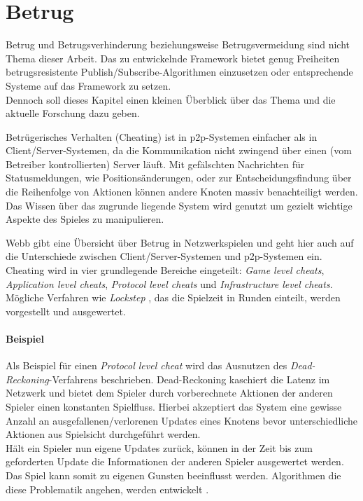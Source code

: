 \section{Betrug}
\label{chap:grundlagen:cheating}
Betrug und Betrugsverhinderung beziehungsweise Betrugsvermeidung sind nicht Thema dieser Arbeit. Das zu entwickelnde Framework bietet genug Freiheiten betrugsresistente Publish/Subscribe-Algorithmen einzusetzen oder entsprechende Systeme auf das Framework zu setzen.\\
Dennoch soll dieses Kapitel einen kleinen Überblick über das Thema und die aktuelle Forschung dazu geben.

Betrügerisches Verhalten (Cheating) ist in p2p-Systemen einfacher als in Client/Server-Systemen, da die Kommunikation nicht zwingend über einen (vom Betreiber kontrollierten) Server läuft. Mit gefälschten Nachrichten für Statusmeldungen, wie Positionsänderungen, oder zur Entscheidungsfindung über die Reihenfolge von Aktionen können andere Knoten massiv benachteiligt werden. Das Wissen über das zugrunde liegende System wird genutzt um gezielt wichtige Aspekte des Spieles zu manipulieren.

Webb \cite{Webb2007Cheating} gibt eine Übersicht über Betrug in Netzwerkspielen und geht hier auch auf die Unterschiede zwischen Client/Server-Systemen und p2p-Systemen ein. Cheating wird in vier grundlegende Bereiche eingeteilt: \emph{Game level cheats}, \emph{Application level cheats}, \emph{Protocol level cheats} und \emph{Infrastructure level cheats}. Mögliche Verfahren wie \emph{Lockstep} \cite{Baughman2007}, das die Spielzeit in Runden einteilt, werden vorgestellt und ausgewertet.

\paragraph{Beispiel}
Als Beispiel für einen \emph{Protocol level cheat} wird das Ausnutzen des \emph{Dead-Reckoning}-Verfahrens \cite{Pantel2002} beschrieben. Dead-Reckoning kaschiert die Latenz im Netzwerk und bietet dem Spieler durch vorberechnete Aktionen der anderen Spieler einen konstanten Spielfluss. Hierbei akzeptiert das System eine gewisse Anzahl an ausgefallenen/verlorenen Updates eines Knotens bevor unterschiedliche Aktionen aus Spielsicht durchgeführt werden.\\
Hält ein Spieler nun eigene Updates zurück, können in der Zeit bis zum geforderten Update die Informationen der anderen Spieler ausgewertet werden. Das Spiel kann somit zu eigenen Gunsten beeinflusst werden. Algorithmen die diese Problematik angehen, werden entwickelt \cite{Aggarwal2005}.


